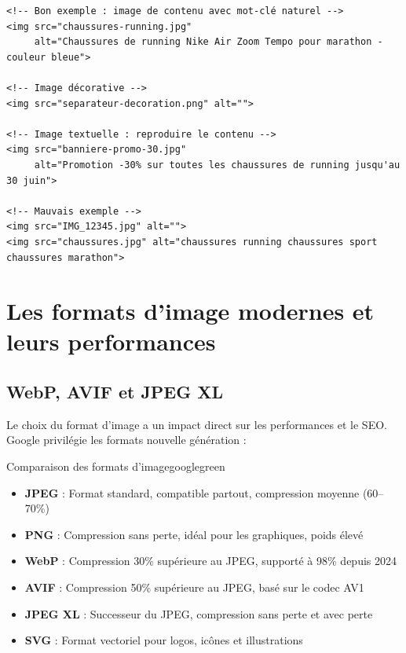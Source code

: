 \documentclass[12pt,a4paper,twoside]{report}
\begin{document}
\begin{lstlisting}[style=htmlcode,caption={Exemples d'attribut Alt optimisés}]
<!-- Bon exemple : image de contenu avec mot-clé naturel -->
<img src="chaussures-running.jpg" 
     alt="Chaussures de running Nike Air Zoom Tempo pour marathon - couleur bleue">

<!-- Image décorative -->
<img src="separateur-decoration.png" alt="">

<!-- Image textuelle : reproduire le contenu -->
<img src="banniere-promo-30.jpg" 
     alt="Promotion -30% sur toutes les chaussures de running jusqu'au 30 juin">

<!-- Mauvais exemple -->
<img src="IMG_12345.jpg" alt="">
<img src="chaussures.jpg" alt="chaussures running chaussures sport chaussures marathon">
\end{lstlisting}

\section{Les formats d'image modernes et leurs performances}

\subsection{WebP, AVIF et JPEG XL}

Le choix du format d'image a un impact direct sur les performances et le SEO. Google privilégie les formats nouvelle génération :

\begin{mybox}{Comparaison des formats d'image}{googlegreen}
\begin{itemize}
    \item \textbf{JPEG} : Format standard, compatible partout, compression moyenne (60--70\%)
    \item \textbf{PNG} : Compression sans perte, idéal pour les graphiques, poids élevé
    \item \textbf{WebP} : Compression 30\% supérieure au JPEG, supporté à 98\% depuis 2024
    \item \textbf{AVIF} : Compression 50\% supérieure au JPEG, basé sur le codec AV1
    \item \textbf{JPEG XL} : Successeur du JPEG, compression sans perte et avec perte
    \item \textbf{SVG} : Format vectoriel pour logos, icônes et illustrations
\end{itemize}
\end{mybox}
\end{document}
